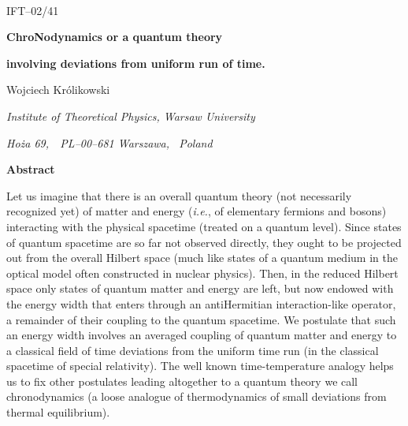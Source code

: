 \documentclass[a4paper,12pt]{article}
\begin{document}
\baselineskip 0.75cm
\topmargin -0.6in
\oddsidemargin -0.1in

\let\ni=\noindent

\renewcommand{\thefootnote}{\fnsymbol{footnote}}

\providecommand{\CKM}{Cabibbo--Kobayashi--Maskawa }

\providecommand{\SM}{Standard Model }

\pagestyle {plain}

\setcounter{page}{1}

\pagestyle{empty}

~~~

\begin{flushright}
IFT--02/41
\end{flushright}

{\large\centerline{\bf ChroNodynamics or a quantum theory}}
{\large\centerline{\bf involving deviations from uniform run of time.}}

\vspace{0.3cm}

{\centerline {\sc Wojciech Kr\'{o}likowski}}

\vspace{0.2cm}

{\centerline {\it Institute of Theoretical Physics, Warsaw University}}

{\centerline {\it Ho\.{z}a 69,~~PL--00--681 Warszawa, ~Poland}}

\vspace{0.3cm}

{\centerline{\bf Abstract}}

\vspace{0.2cm}

Let us imagine that there is an overall quantum theory  (not necessarily recognized yet) of matter and energy ({\it i.e.}, of elementary fermions and bosons) interacting with the physical spacetime (treated on a quantum level). Since states of quantum spacetime are so far not observed directly, they ought to be projected out from the overall Hilbert space (much like states of a quantum medium in the optical model often constructed in nuclear physics). Then, in the reduced Hilbert space only states of quantum matter and energy are left, but now endowed with the energy width that enters through an antiHermitian interaction-like operator, a remainder of their coupling to the quantum spacetime. We postulate that such an energy width involves an averaged coupling of quantum matter and energy to a classical field of time deviations from the uniform time run (in the classical spacetime of special relativity). The well known time-temperature analogy helps us to fix other postulates leading altogether to a quantum theory we call chronodynamics (a loose analogue of thermodynamics of small deviations from thermal equilibrium).
\end{document}

